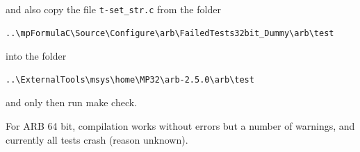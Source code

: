 and also copy the file  \verb|t-set_str.c|  from the folder
\begin{verbatim}
..\mpFormulaC\Source\Configure\arb\FailedTests32bit_Dummy\arb\test
\end{verbatim}
into the folder
\begin{verbatim}
..\ExternalTools\msys\home\MP32\arb-2.5.0\arb\test
\end{verbatim}


and only then run make check.



\vpara
For ARB 64 bit, compilation works without errors but a number of warnings, and currently all tests crash (reason unknown).






%
%
%
%
%
%
%
%
%
%
%
%
%
%
%
%
%
%
%
%
%
%
%
%
%
%
%
